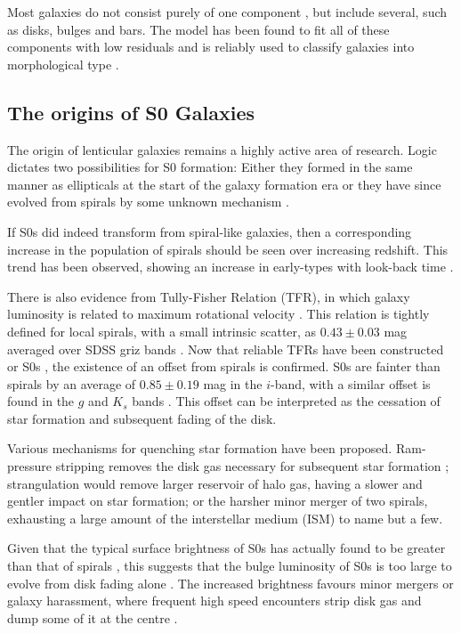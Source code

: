 Most galaxies do not consist purely of one component \citep{laurikainen_multicomponent_2005}, but include several, such as disks, bulges and bars. The \sersic model has been found to fit all of these components with low residuals and is reliably used to classify galaxies into morphological type \citep{peng_detailed_2010}.

\subsection{The origins of S0 Galaxies}
The origin of lenticular galaxies remains a highly active area of research. Logic dictates two possibilities for S0 formation: Either they formed in the same manner as ellipticals at the start of the galaxy formation era or they have since evolved from spirals by some unknown mechanism \citep{burstein_k-band_2005}.

If S0s did indeed transform from spiral-like galaxies, then a corresponding increase in the population of spirals should be seen over increasing redshift. This trend has been observed, showing an increase in early-types with look-back time \citep{dressler_evolution_1997}.

There is also evidence from Tully-Fisher Relation (TFR), in which galaxy luminosity is related to maximum rotational velocity \citep{tully_new_1977}. This relation is tightly defined for local spirals, with a small intrinsic scatter, as $0.43 \pm 0.03$ mag averaged over SDSS griz bands \citep{pizagno_tully-fisher_2007}. Now that reliable TFRs have been constructed or S0s \citep{bedregal_tullyfisher_2006}, the existence of an offset from spirals is confirmed. S0s are fainter than spirals by an average of $0.85 \pm 0.19$ mag in the $i$-band, with a similar offset is found in the $g$ and $K_s$ bands \citep{rawle_s0_2013}. This offset can be interpreted as the cessation of star formation and subsequent fading of the disk.

Various mechanisms for quenching star formation have been proposed. Ram-pressure stripping removes the disk gas necessary for subsequent star formation \citep{gunn_infall_1972}; strangulation would remove larger reservoir of halo gas, having a slower and gentler impact on star formation; or the harsher minor merger of two spirals, exhausting a large amount of the interstellar medium (ISM)  \citep{bekki_unequal-mass_1998} to name but a few.

Given that the typical surface brightness of S0s has actually found to be greater than that of spirals \citep{burstein_k-band_2005}, this suggests that the bulge luminosity of S0s is too large to evolve from disk fading alone \citep{cortesi_planetary_2013}. The increased brightness favours minor mergers or galaxy harassment, where frequent high speed encounters strip disk gas and dump some of it at the centre \citep{moore_galaxy_1996}.

